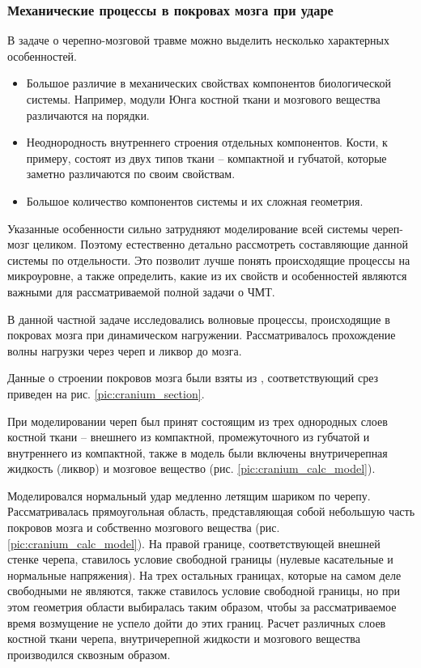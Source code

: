 \clearpage
\newpage

\subsubsection*{Механические процессы в покровах мозга при ударе}

В задаче о черепно-мозговой травме можно выделить несколько характерных особенностей.

\begin{itemize}

\item Большое различие в механических свойствах компонентов биологической системы. Например, модули Юнга костной ткани и мозгового вещества различаются на порядки.

\item Неоднородность внутреннего строения отдельных компонентов. Кости, к примеру, состоят из двух типов ткани -- компактной и губчатой, которые заметно различаются по своим свойствам.

\item Большое количество компонентов системы и их сложная геометрия.

\end{itemize}

Указанные особенности сильно затрудняют моделирование всей системы череп-мозг целиком. Поэтому естественно детально рассмотреть составляющие данной системы по отдельности. Это позволит лучше понять происходящие процессы на микроуровне, а также определить, какие из их свойств и особенностей являются важными для рассматриваемой полной задачи о ЧМТ.

В данной частной задаче исследовались волновые процессы, происходящие в покровах мозга при динамическом нагружении. Рассматривалось прохождение волны нагрузки через череп и ликвор до мозга. 

Данные о строении покровов мозга были взяты из \cite{anatomy_atlas}, соответствующий срез приведен на рис. \ref{pic:cranium_section}.

При моделировании череп был принят состоящим из трех однородных слоев костной ткани – внешнего из компактной, промежуточного из губчатой и внутреннего из компактной, также в модель были включены внутричерепная жидкость (ликвор) и мозговое вещество (рис. \ref{pic:cranium_calc_model}).

Моделировался нормальный удар медленно летящим шариком по черепу. Рассматривалась прямоугольная область, представляющая собой небольшую часть покровов мозга и собственно мозгового вещества (рис. \ref{pic:cranium_calc_model}). На правой границе, соответствующей внешней стенке черепа, ставилось условие свободной границы (нулевые касательные и нормальные напряжения). На трех остальных границах, которые на самом деле свободными не являются, также ставилось условие свободной границы, но при этом геометрия области выбиралась таким образом, чтобы за рассматриваемое время возмущение не успело дойти до этих границ. Расчет различных слоев костной ткани черепа, внутричерепной жидкости и мозгового вещества производился сквозным образом.

